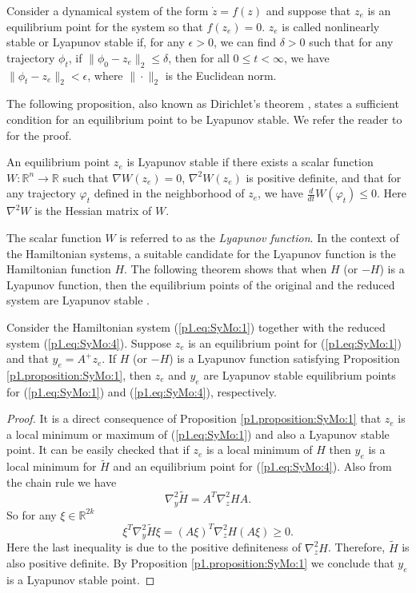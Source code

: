 \begin{definition} \label{p1.definition:SyMo:1} \cite{bhatia2002stability}
Consider a dynamical system of the form $\dot{z} = f(z)$ and suppose that $z_e$ is an equilibrium point for the system so that $f(z_e) = 0$. $ z_e$ is called nonlinearly stable or Lyapunov stable if, for any $\epsilon > 0$, we can find $\delta > 0$ such that for any trajectory $\phi_t$, if $\| \phi_0 -  z_e \|_2 \leq \delta$, then for all $0 \leq t < \infty$, we have $\| \phi_t -  z_e \|_2 < \epsilon$, where $\| \cdot \|_2$ is the Euclidean norm.
\end{definition}	
The following proposition, also known as Dirichlet's theorem \cite{bhatia2002stability}, states a sufficient condition for an equilibrium point to be Lyapunov stable. We refer the reader to \cite{bhatia2002stability} for the proof.
\begin{proposition} \label{p1.proposition:SyMo:1} \cite{bhatia2002stability}
An equilibrium point $ z_e$ is Lyapunov stable if there exists a scalar function $W : \mathbb R^{n} \to  \mathbb R$ such that $\nabla W( z_e) = 0$, $\nabla^2 W(z_e)$ is positive definite, and that for any trajectory $\varphi_t$ defined in the neighborhood of $ z_e$, we have $\frac{d}{dt} W(\varphi_t) \leq 0$. Here $\nabla^2W$ is the Hessian matrix of $W$.
\end{proposition}
The scalar function $W$ is referred to as the \emph{Lyapunov function}. In the context of the Hamiltonian systems, a suitable candidate for the Lyapunov function is the Hamiltonian function $H$. The following theorem shows that when $H$ (or $-H$) is a Lyapunov function, then the equilibrium points of the original and the reduced system are Lyapunov stable \cite{abraham1978foundations}. 
\begin{theorem} \label{p1.theorem:SyMo:1}
Consider the Hamiltonian system (\ref{p1.eq:SyMo:1}) together with the reduced system (\ref{p1.eq:SyMo:4}). Suppose $z_e$ is an equilibrium point for (\ref{p1.eq:SyMo:1}) and that $y_e = A^+z_e$. If $H$ (or $-H$) is a Lyapunov function satisfying Proposition \ref{p1.proposition:SyMo:1}, then $z_e$ and $ y_e$ are Lyapunov stable equilibrium points for (\ref{p1.eq:SyMo:1}) and (\ref{p1.eq:SyMo:4}), respectively. 
\end{theorem}
\begin{proof}
	It is a direct consequence of Proposition \ref{p1.proposition:SyMo:1} that $ z_e$ is a local minimum or maximum of (\ref{p1.eq:SyMo:1}) and also a Lyapunov stable point. It can be easily checked that if $ z_e$ is a local minimum of $H$ then $y_e$ is a local minimum for $\tilde H$ and an equilibrium point for (\ref{p1.eq:SyMo:4}). Also from the chain rule we have
\[
	\nabla^2_{y} \tilde H = A^T \nabla^2_{z} H A.
\]
So for any $\xi \in \mathbb R^{2k}$
\[
	\xi^T \nabla^2_{y} \tilde H \xi = (A\xi)^T \nabla^2_{z} H (A\xi) \geq 0.
\]
Here the last inequality is due to the positive definiteness of $\nabla^2_z H$. Therefore, $\tilde H$ is also positive definite. By Proposition \ref{p1.proposition:SyMo:1} we conclude that $ y_e$ is a Lyapunov stable point.
\end{proof}

